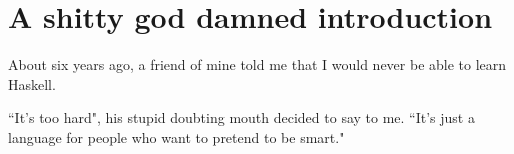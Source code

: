\chapter*{A shitty god damned introduction}

About six years ago, a friend of mine told me that I would never be able to learn Haskell.  

``It's too hard", his stupid doubting mouth decided to say to me.  ``It's just a language for people who want to pretend to be smart."


